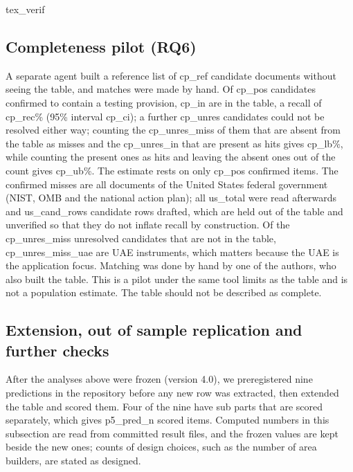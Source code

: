 \documentclass[conference]{IEEEtran}
\begin{document}
\begin{table}[t]\centering\small
{{tex_verif}}
\caption{Fresh verification sample, readable rows only.}\label{tab:vf}
\end{table}

\subsection{Completeness pilot (RQ6)}\label{sec:complete}
A separate agent built a reference list of {{cp_ref}} candidate documents without seeing the table, and matches were made by hand. Of {{cp_pos}} candidates confirmed to contain a testing provision, {{cp_in}} are in the table, a recall of {{cp_rec}}\% (95\% interval {{cp_ci}}); a further {{cp_unres}} candidates could not be resolved either way; counting the {{cp_unres_miss}} of them that are absent from the table as misses and the {{cp_unres_in}} that are present as hits gives {{cp_lb}}\%, while counting the present ones as hits and leaving the absent ones out of the count gives {{cp_ub}}\%. The estimate rests on only {{cp_pos}} confirmed items. The confirmed misses are all documents of the United States federal government (NIST, OMB and the national action plan); all {{us_total}} were read afterwards and {{us_cand_rows}} candidate rows drafted, which are held out of the table and unverified so that they do not inflate recall by construction. Of the {{cp_unres_miss}} unresolved candidates that are not in the table, {{cp_unres_miss_uae}} are UAE instruments, which matters because the UAE is the application focus. Matching was done by hand by one of the authors, who also built the table. This is a pilot under the same tool limits as the table and is not a population estimate. The table should not be described as complete.

\subsection{Extension, out of sample replication and further checks}\label{sec:phase5}
After the analyses above were frozen (version 4.0), we preregistered nine predictions in the repository before any new row was extracted, then extended the table and scored them. Four of the nine have sub parts that are scored separately, which gives {{p5_pred_n}} scored items. Computed numbers in this subsection are read from committed result files, and the frozen values are kept beside the new ones; counts of design choices, such as the number of area builders, are stated as designed.
\end{document}
